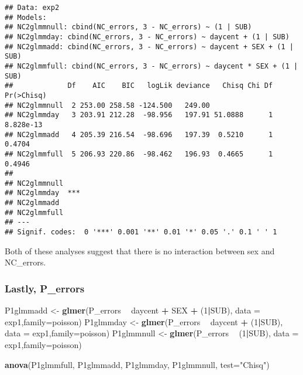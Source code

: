 \documentclass[]{article}
\newenvironment{Shaded}{\begin{snugshade}}{\end{snugshade}}
\newcommand{\KeywordTok}[1]{\textcolor[rgb]{0.13,0.29,0.53}{\textbf{#1}}}
\newcommand{\DataTypeTok}[1]{\textcolor[rgb]{0.13,0.29,0.53}{#1}}
\newcommand{\DecValTok}[1]{\textcolor[rgb]{0.00,0.00,0.81}{#1}}
\newcommand{\StringTok}[1]{\textcolor[rgb]{0.31,0.60,0.02}{#1}}
\newcommand{\OperatorTok}[1]{\textcolor[rgb]{0.81,0.36,0.00}{\textbf{#1}}}
\newcommand{\NormalTok}[1]{#1}
\begin{document}
\begin{verbatim}
## Data: exp2
## Models:
## NC2glmmnull: cbind(NC_errors, 3 - NC_errors) ~ (1 | SUB)
## NC2glmmday: cbind(NC_errors, 3 - NC_errors) ~ daycent + (1 | SUB)
## NC2glmmadd: cbind(NC_errors, 3 - NC_errors) ~ daycent + SEX + (1 | SUB)
## NC2glmmfull: cbind(NC_errors, 3 - NC_errors) ~ daycent * SEX + (1 | SUB)
##             Df    AIC    BIC   logLik deviance   Chisq Chi Df Pr(>Chisq)
## NC2glmmnull  2 253.00 258.58 -124.500   249.00                          
## NC2glmmday   3 203.91 212.28  -98.956   197.91 51.0888      1  8.828e-13
## NC2glmmadd   4 205.39 216.54  -98.696   197.39  0.5210      1     0.4704
## NC2glmmfull  5 206.93 220.86  -98.462   196.93  0.4665      1     0.4946
##                
## NC2glmmnull    
## NC2glmmday  ***
## NC2glmmadd     
## NC2glmmfull    
## ---
## Signif. codes:  0 '***' 0.001 '**' 0.01 '*' 0.05 '.' 0.1 ' ' 1
\end{verbatim}

Both of these analyses suggest that there is no interaction between sex
and NC\_errors.

\subsubsection{Lastly, P\_errors}\label{lastly-p_errors}

\begin{Shaded}
\begin{Highlighting}[]
\NormalTok{P1glmmadd <-}\StringTok{ }\KeywordTok{glmer}\NormalTok{(P_errors }\OperatorTok{~}\StringTok{ }\NormalTok{daycent }\OperatorTok{+}\StringTok{ }\NormalTok{SEX }\OperatorTok{+}\StringTok{ }\NormalTok{(}\DecValTok{1}\OperatorTok{|}\NormalTok{SUB), }\DataTypeTok{data =}\NormalTok{ exp1,}\DataTypeTok{family=}\NormalTok{poisson)}
\NormalTok{P1glmmday <-}\StringTok{ }\KeywordTok{glmer}\NormalTok{(P_errors }\OperatorTok{~}\StringTok{ }\NormalTok{daycent }\OperatorTok{+}\StringTok{ }\NormalTok{(}\DecValTok{1}\OperatorTok{|}\NormalTok{SUB), }\DataTypeTok{data =}\NormalTok{ exp1,}\DataTypeTok{family=}\NormalTok{poisson)}
\NormalTok{P1glmmnull <-}\StringTok{ }\KeywordTok{glmer}\NormalTok{(P_errors }\OperatorTok{~}\StringTok{ }\NormalTok{(}\DecValTok{1}\OperatorTok{|}\NormalTok{SUB), }\DataTypeTok{data =}\NormalTok{ exp1,}\DataTypeTok{family=}\NormalTok{poisson)}

\KeywordTok{anova}\NormalTok{(P1glmmfull, P1glmmadd, P1glmmday, P1glmmnull, }\DataTypeTok{test=}\StringTok{"Chisq"}\NormalTok{)}
\end{Highlighting}
\end{Shaded}
\end{document}
